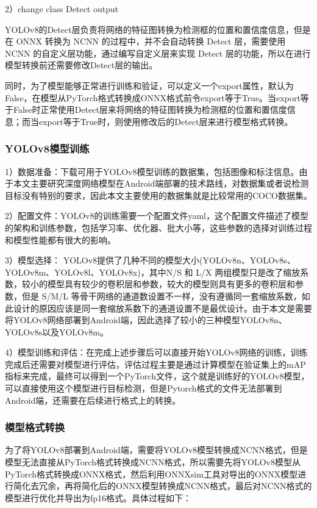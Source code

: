 \documentclass{ctexart}
\numberwithin{equation}{section}%
\numberwithin{figure}{section}%
\numberwithin{table}{section}%
\begin{document}
	2）change class Detect output
	
	YOLOv8的Detect层负责将网络的特征图转换为检测框的位置和置信度信息，但是在 ONNX 转换为 NCNN 的过程中，并不会自动转换 Detect 层，需要使用 NCNN 的自定义层功能，通过编写自定义层来实现 Detect 层的功能，所以在进行模型转换前还需要修改Detect层的输出。

	同时，为了模型能够正常进行训练和验证，可以定义一个export属性，默认为False，在模型从PyTorch格式转换成ONNX格式前令export等于True。当export等于False时正常使用Detect层来将网络的特征图转换为检测框的位置和置信度信息；而当export等于True时，则使用修改后的Detect层来进行模型格式转换。
	
	\subsubsection{YOLOv8模型训练}	
	1）数据准备：下载可用于YOLOv8模型训练的数据集，包括图像和标注信息。由于本文主要研究深度网络模型在Android端部署的技术路线，对数据集或者说检测目标没有特别的要求，因此本文主要使用的数据集就是比较常用的COCO数据集。

	2）配置文件：YOLOv8的训练需要一个配置文件yaml，这个配置文件描述了模型的架构和训练参数，包括学习率、优化器、批大小等，这些参数的选择对训练过程和模型性能都有很大的影响。
	
	3）模型选择：
	YOLOv8提供了几种不同的模型大小(YOLOv8n、YOLOv8s、YOLOv8m、YOLOv8l、YOLOv8x)，其中N/S 和 L/X 两组模型只是改了缩放系数，较小的模型具有较少的卷积层和参数，较大的模型则具有更多的卷积层和参数，但是 S/M/L 等骨干网络的通道数设置不一样，没有遵循同一套缩放系数，如此设计的原因应该是同一套缩放系数下的通道设置不是最优设计。由于本文是需要将YOLOv8网络部署到Android端，因此选择了较小的三种模型YOLOv8n、YOLOv8s以及YOLOv8m。
	
	4）模型训练和评估：在完成上述步骤后可以直接开始YOLOv8网络的训练，训练完成后还需要对模型进行评估，评估过程主要是通过计算模型在验证集上的mAP指标来完成，最终可以得到一个PyTorch文件，这个就是训练好的YOLOv8模型，可以直接使用这个模型进行目标检测，但是Pytorch格式的文件无法部署到Android端，还需要在后续进行格式上的转换。
	
	\subsubsection{模型格式转换}
	为了将YOLOv8部署到Android端，需要将YOLOv8模型转换成NCNN格式，但是模型无法直接从PyTorch格式转换成NCNN格式，所以需要先将YOLOv8模型从PyTorch格式转换成ONNX格式，然后利用ONNXsim工具对导出的ONNX模型进行简化去冗余，再将简化后的ONNX模型转换成NCNN格式，最后对NCNN格式的模型进行优化并导出为fp16格式。具体过程如下：
	
\end{document}
